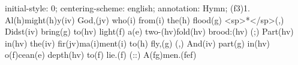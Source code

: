 initial-style: 0;
centering-scheme: english;
annotation: Hymn;
(f3)1. Al(h)might(h)y(iv) God,(jv) who(i) from(i) the(h) flood(g) <sp>*</sp>(,)
Didst(iv) bring(g) to(hv) light(f) a(e) two-(hv)fold(hv) brood:(hv) (;)
Part(hv) in(hv) the(iv) fir(jv)ma(i)ment(i) to(h) fly,(g) (,)
And(iv) part(g) in(hv) o(f)cean(e) depth(hv) to(f) lie.(f) (::) A(fg)men.(fef)
